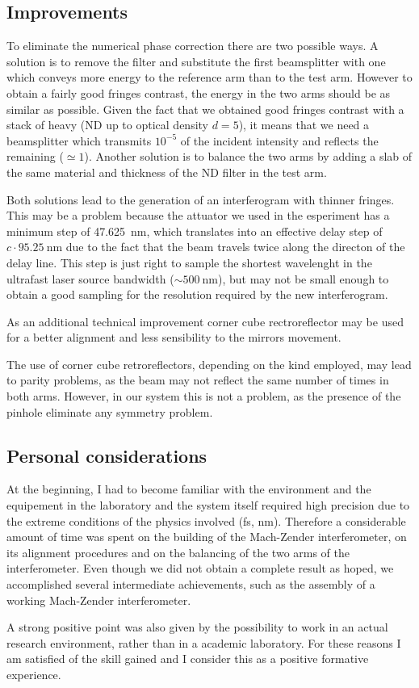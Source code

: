 \documentclass[12pt,a4paper,twoside]{article}
\begin{document}
\subsection{Improvements}
To eliminate the numerical phase correction there are two possible ways.
A solution is to remove the filter and substitute the first beamsplitter with one which conveys more energy to the reference arm than to the test arm.
However to obtain a fairly good fringes contrast, the energy in the two arms should be as similar as possible.
Given the fact that we obtained good fringes contrast with a stack of heavy (ND up to optical density $d=5$), it means that we need a beamsplitter which transmits $10^{-5}$ of the incident intensity and reflects the remaining ($\simeq 1$).
Another solution is to balance the two arms by adding a slab of the same material and thickness of the ND filter in the test arm.

Both solutions lead to the generation of an interferogram with thinner fringes.
This may be a problem because the attuator we used in the esperiment has a minimum step of \SI{47.625}{\nm}, which translates into an effective delay step of $c\cdot\SI{95.25}{\nm}$ due to the fact that the beam travels twice along the directon of the delay line.
This step is just right to sample the shortest wavelenght in the ultrafast laser source bandwidth ($\sim \SI{500}{\nm}$), but may not be small enough to obtain a good sampling for the resolution required by the new interferogram.

As an additional technical improvement corner cube rectroreflector may be used for a better alignment and less sensibility to the mirrors movement.

The use of corner cube retroreflectors, depending on the kind employed, may lead to parity problems, as the beam may not reflect the same number of times in both arms.
However, in our system this is not a problem, as the presence of the pinhole eliminate any symmetry problem.

\subsection{Personal considerations}
At the beginning, I had to become familiar with the environment and the equipement in the
laboratory and the system itself required high precision due to the extreme conditions of the physics involved (\si{\fs}, \si{\nm}).
Therefore a considerable amount of time was spent on the building of the Mach-Zender interferometer, on its alignment procedures and on the balancing of the two arms of the interferometer.
Even though we did not obtain a complete result as hoped, we accomplished several intermediate achievements, such as the assembly of a working Mach-Zender interferometer.

A strong positive point was also given by the possibility to work in an actual research environment, rather than in a academic laboratory.
For these reasons I am satisfied of the skill gained and I consider this as a positive formative experience.

\clearpage

\end{document}
